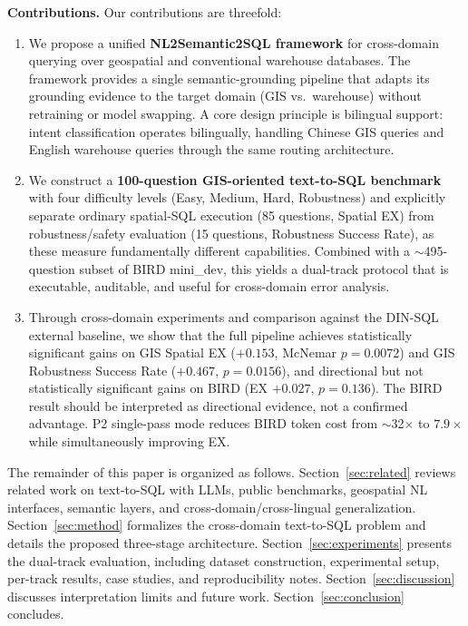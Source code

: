 \documentclass[11pt]{article}
\begin{document}
\medskip
\noindent\textbf{Contributions.} Our contributions are threefold:
\begin{enumerate}[leftmargin=*]
  \item We propose a unified \textbf{NL2Semantic2SQL framework} for cross-domain querying over geospatial and conventional warehouse databases. The framework provides a single semantic-grounding pipeline that adapts its grounding evidence to the target domain (GIS vs.\ warehouse) without retraining or model swapping. A core design principle is bilingual support: intent classification operates bilingually, handling Chinese GIS queries and English warehouse queries through the same routing architecture.
  \item We construct a \textbf{100-question GIS-oriented text-to-SQL benchmark} with four difficulty levels (Easy, Medium, Hard, Robustness) and explicitly separate ordinary spatial-SQL execution (85 questions, Spatial EX) from robustness/safety evaluation (15 questions, Robustness Success Rate), as these measure fundamentally different capabilities. Combined with a $\sim$495-question subset of BIRD mini\_dev, this yields a dual-track protocol that is executable, auditable, and useful for cross-domain error analysis.
  \item Through cross-domain experiments and comparison against the DIN-SQL external baseline, we show that the full pipeline achieves statistically significant gains on GIS Spatial EX ($+0.153$, McNemar $p=0.0072$) and GIS Robustness Success Rate ($+0.467$, $p=0.0156$), and directional but not statistically significant gains on BIRD (EX $+0.027$, $p=0.136$). The BIRD result should be interpreted as directional evidence, not a confirmed advantage. P2 single-pass mode reduces BIRD token cost from $\sim$32$\times$ to $7.9\times$ while simultaneously improving EX.
\end{enumerate}

The remainder of this paper is organized as follows. Section~\ref{sec:related} reviews related work on text-to-SQL with LLMs, public benchmarks, geospatial NL interfaces, semantic layers, and cross-domain/cross-lingual generalization. Section~\ref{sec:method} formalizes the cross-domain text-to-SQL problem and details the proposed three-stage architecture. Section~\ref{sec:experiments} presents the dual-track evaluation, including dataset construction, experimental setup, per-track results, case studies, and reproducibility notes. Section~\ref{sec:discussion} discusses interpretation limits and future work. Section~\ref{sec:conclusion} concludes.
\end{document}
